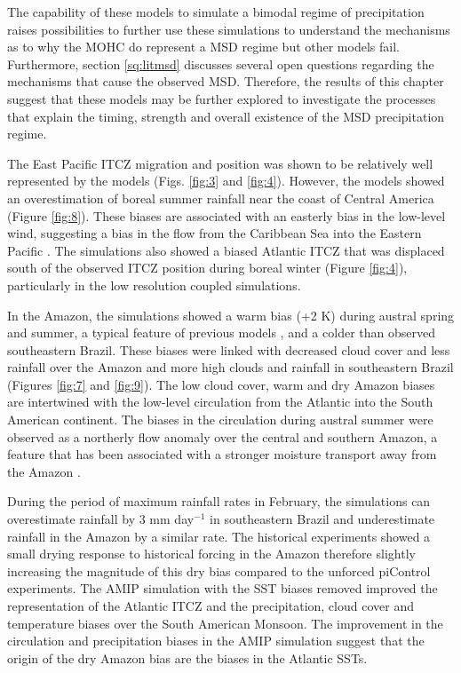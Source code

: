 The capability of these models to simulate a bimodal regime of precipitation raises possibilities to further use these simulations to understand the mechanisms as to why the MOHC do represent a MSD regime but other models fail. Furthermore, section \ref{sq:litmsd} discusses several open questions regarding the mechanisms that cause the observed MSD. Therefore, the results of this chapter suggest that these models may be further explored to investigate the processes that explain the timing, strength and overall existence of the MSD precipitation regime. 


The East Pacific ITCZ migration and position was shown to be relatively well represented by the models (Figs. \ref{fig:3} and \ref{fig:4}). However, the models showed an overestimation of boreal summer rainfall near the coast of Central America (Figure \ref{fig:8}). These biases are associated with an easterly bias in the low-level wind, suggesting a bias in the flow from the Caribbean Sea into the Eastern Pacific  \citep{herrera2015,duranquesada2017}. 
The simulations also showed a biased Atlantic ITCZ that was displaced south of the observed ITCZ position during boreal winter (Figure \ref{fig:4}), particularly in the low resolution coupled simulations. 

In the Amazon, the simulations showed a warm bias (+2 K) during austral spring and summer, a typical feature of previous models \citep{jones2013}, and a colder than observed southeastern Brazil.
 These biases were linked with decreased cloud cover and less rainfall over the Amazon and more high clouds and rainfall in southeastern Brazil (Figures \ref{fig:7} and \ref{fig:9}). 
The low cloud cover, warm and dry Amazon biases are intertwined with the low-level circulation from the Atlantic into the South American continent. The biases in the circulation during austral summer were observed as a northerly flow anomaly over the central and southern Amazon, a feature that has been associated with a stronger moisture transport away from the Amazon \citep{marengo2012,jones2017}. %


During the period of maximum rainfall rates in February, the simulations can overestimate rainfall by 3 mm day$^{-1}$ in southeastern Brazil and underestimate rainfall in the Amazon by a similar rate. The historical experiments showed a small drying response to historical forcing in the Amazon therefore slightly increasing the magnitude of this dry bias compared to the unforced piControl experiments.
The AMIP simulation with the SST biases removed improved the representation of the Atlantic ITCZ and the precipitation, cloud cover and temperature biases over the South American Monsoon.   The improvement in the circulation and precipitation biases in the AMIP simulation suggest that the origin of the dry Amazon bias are the biases in the Atlantic SSTs. 


